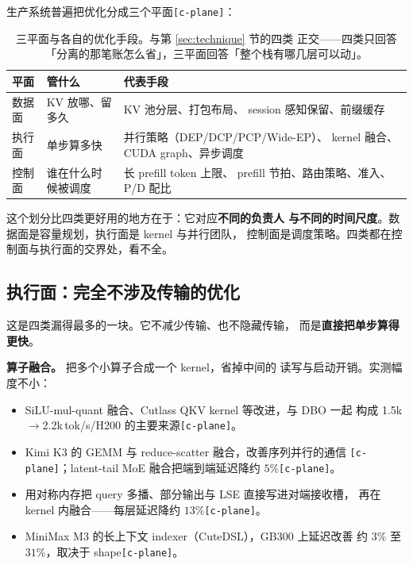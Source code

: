 生产系统普遍把优化分成三个平面\texttt{[c-plane]}：

\begin{table}[t]
\centering
\caption{三平面与各自的优化手段。与第 \ref{sec:technique} 节的四类
正交——四类只回答「分离的那笔账怎么省」，三平面回答「整个栈有哪几层可以动」。}
\label{tab:plane}
\small
\setlength{\tabcolsep}{9pt}
\begin{tabular}{@{}p{2.5cm}p{5.32cm}p{7.81cm}@{}}
\toprule
平面 & 管什么 & 代表手段 \\
\midrule
数据面 & KV 放哪、留多久 & KV 池分层、打包布局、
  session 感知保留、前缀缓存 \\
执行面 & 单步算多快 & 并行策略（DEP/DCP/PCP/Wide-EP）、
  kernel 融合、CUDA graph、异步调度 \\
控制面 & 谁在什么时候被调度 & 长 prefill token 上限、
  prefill 节拍、路由策略、准入、P/D 配比 \\
\bottomrule
\end{tabular}
\end{table}

\noindent 这个划分比四类更好用的地方在于：它对应\textbf{不同的负责人
与不同的时间尺度}。数据面是容量规划，执行面是 kernel 与并行团队，
控制面是调度策略。四类都在控制面与执行面的交界处，看不全。

\subsection{执行面：完全不涉及传输的优化}

这是四类漏得最多的一块。它不减少传输、也不隐藏传输，
而是\textbf{直接把单步算得更快}。

\noindent\textbf{算子融合。} 把多个小算子合成一个 kernel，省掉中间的
读写与启动开销。实测幅度不小：

\begin{itemize}[leftmargin=1.3em,itemsep=1pt,topsep=2pt]
  \item SiLU-mul-quant 融合、Cutlass QKV kernel 等改进，与 DBO 一起
        构成 1.5k$\to$2.2k\,tok/s/H200 的主要来源\texttt{[c-plane]}。
  \item Kimi K3 的 GEMM 与 reduce-scatter 融合，改善序列并行的通信
        \texttt{[c-plane]}；latent-tail MoE 融合把端到端延迟降约
        $5\%$\texttt{[c-plane]}。
  \item 用对称内存把 query 多播、部分输出与 LSE 直接写进对端接收槽，
        再在 kernel 内融合——每层延迟降约 $13\%$\texttt{[c-plane]}。
  \item MiniMax M3 的长上下文 indexer（CuteDSL），GB300 上延迟改善
        约 $3\%$ 至 $31\%$，取决于 shape\texttt{[c-plane]}。
\end{itemize}

